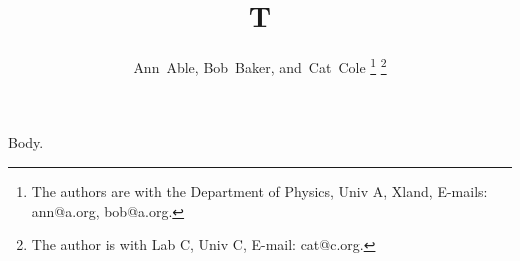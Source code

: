 \documentclass[journal]{IEEEtran}
\begin{document}
\title{T}
\author{Ann~Able, Bob~Baker, and~Cat~Cole%
\thanks{The authors are with the Department of Physics, Univ A, Xland, E-mails: ann@a.org, bob@a.org.}%
\thanks{The author is with Lab C, Univ C, E-mail: cat@c.org.}}
\maketitle
Body.
\end{document}
